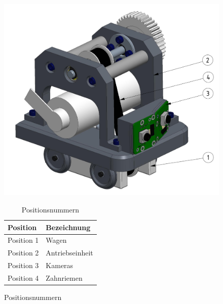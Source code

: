 \documentclass[../../main.tex]{subfiles}
\begin{document}
\begin{figure}[H]
\begin{minipage}{.6\textwidth}
  \includegraphics[width=.9\textwidth]{antriebswagen.PNG}
   \caption[]{Konzept Antriebswagen}
   \label{fig:antriebswagen1}
 \end{minipage}
\begin{minipage}{.4\textwidth}
\begin{table}[H] \centering
  \begin{tabular}{|l|l|}
  \hline
  \textbf{Position} & \textbf{Bezeichnung}\\
  \hline
  Position 1          & Wagen\\
   \hline
  Position 2          & Antriebseinheit\\
  \hline
  Position 3          & Kameras\\
  \hline
  Position 4          & Zahnriemen\\
  \hline
 \end{tabular}
 \caption{Positionsnummern}
 \label{tab:expl_antriebswagen}
 \end{table}
 \end{minipage}
\end{figure}
\end{document}
